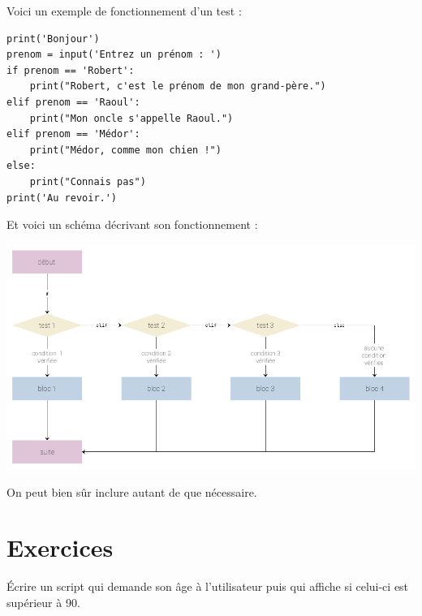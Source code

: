 Voici un exemple de fonctionnement d'un test  :
\begin{pyc}
	\begin{verbatim}
print('Bonjour')
prenom = input('Entrez un prénom : ')
if prenom == 'Robert':
    print("Robert, c'est le prénom de mon grand-père.")
elif prenom == 'Raoul':
    print("Mon oncle s'appelle Raoul.")
elif prenom == 'Médor':
    print("Médor, comme mon chien !")
else:
    print("Connais pas")
print('Au revoir.')
\end{verbatim}
\end{pyc}
Et voici un schéma décrivant son fonctionnement :
\begin{center}
	\includegraphics[width=\linewidth]{img/ifelifelse}
\end{center}



On peut bien sûr inclure autant de  que nécessaire.

\section{Exercices}

\begin{exercice}
	\'Ecrire un script qui demande son âge à l'utilisateur puis qui affiche  si celui-ci est supérieur à 90.
\end{exercice}

